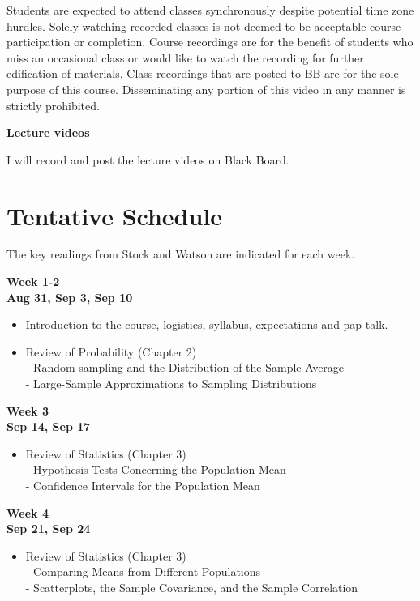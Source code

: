 \documentclass[
]{book}
\providecommand{\tightlist}{%
  \setlength{\itemsep}{0pt}\setlength{\parskip}{0pt}}
\begin{document}
Students are expected to attend classes synchronously despite potential time zone hurdles. Solely watching recorded classes is not deemed to be acceptable course participation or completion. Course recordings are for the benefit of students who miss an occasional class or would like to watch the recording for further edification of materials. Class recordings that are posted to BB are for the sole purpose of this course. Disseminating any portion of this video in any manner is strictly prohibited.

\textbf{Lecture videos}

I will record and post the lecture videos on Black Board.

\hypertarget{tentative-schedule}{%
\section*{Tentative Schedule}\label{tentative-schedule}}

The key readings from Stock and Watson are indicated for each week.

\textbf{Week 1-2}\\
\textbf{Aug 31, Sep 3, Sep 10}

\begin{itemize}
\tightlist
\item
  Introduction to the course, logistics, syllabus, expectations and pap-talk.\\
\item
  Review of Probability (Chapter 2)\\
  - Random sampling and the Distribution of the Sample Average\\
  - Large-Sample Approximations to Sampling Distributions
\end{itemize}

\textbf{Week 3}\\
\textbf{Sep 14, Sep 17}

\begin{itemize}
\tightlist
\item
  Review of Statistics (Chapter 3)\\
  - Hypothesis Tests Concerning the Population Mean\\
  - Confidence Intervals for the Population Mean
\end{itemize}

\textbf{Week 4}\\
\textbf{Sep 21, Sep 24}

\begin{itemize}
\tightlist
\item
  Review of Statistics (Chapter 3)\\
  - Comparing Means from Different Populations\\
  - Scatterplots, the Sample Covariance, and the Sample Correlation
\end{itemize}
\end{document}
